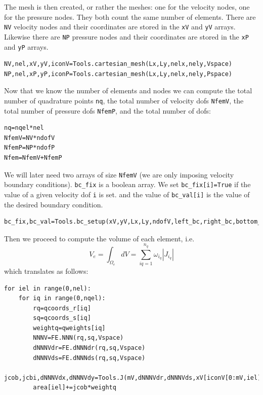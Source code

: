 The mesh is then created, or rather the meshes: one for the 
velocity nodes, one for the pressure nodes. They both count the 
same number of elements. There are \lstinline{NV} velocity nodes and their
coordinates are stored in the \lstinline{xV} and \lstinline{yV} arrays.
Likewise there are \lstinline{NP} pressure nodes and their
coordinates are stored in the \lstinline{xP} and \lstinline{yP} arrays. 

\begin{lstlisting}
NV,nel,xV,yV,iconV=Tools.cartesian_mesh(Lx,Ly,nelx,nely,Vspace)
NP,nel,xP,yP,iconP=Tools.cartesian_mesh(Lx,Ly,nelx,nely,Pspace)
\end{lstlisting}

Now that we know the number of elements and nodes we can compute the 
total number of quadrature points \lstinline{nq}, 
the total number of velocity dofs \lstinline{NfemV}, 
the total number of pressure dofs \lstinline{NfemP}, 
and the total number of dofs:

\begin{lstlisting}
nq=nqel*nel
NfemV=NV*ndofV
NfemP=NP*ndofP
Nfem=NfemV+NfemP
\end{lstlisting}

We will later need two arrays of size \lstinline{NfemV} (we are only imposing
velocity boundary conditions). \lstinline{bc_fix} is a boolean array.
We set \lstinline{bc_fix[i]=True} if the value of a given velocity dof \lstinline{i} is set. 
and the value of \lstinline{bc_val[i]} is the value of the desired boundary condition.

\begin{lstlisting}
bc_fix,bc_val=Tools.bc_setup(xV,yV,Lx,Ly,ndofV,left_bc,right_bc,bottom_bc,top_bc)
\end{lstlisting}

Then we proceed to compute the volume of each element, i.e. 
\[
V_e = \int_{\Omega_e} dV = \sum_{iq=1}^{n_q} \omega_{i_q} |J_{i_q}|
\]
which translates as follows: 
\begin{lstlisting}
for iel in range(0,nel):
    for iq in range(0,nqel):
        rq=qcoords_r[iq]
        sq=qcoords_s[iq]
        weightq=qweights[iq]
        NNNV=FE.NNN(rq,sq,Vspace)
        dNNNVdr=FE.dNNNdr(rq,sq,Vspace)
        dNNNVds=FE.dNNNds(rq,sq,Vspace)
        jcob,jcbi,dNNNVdx,dNNNVdy=Tools.J(mV,dNNNVdr,dNNNVds,xV[iconV[0:mV,iel]],yV[iconV[0:mV,iel]])
        area[iel]+=jcob*weightq
\end{lstlisting}



